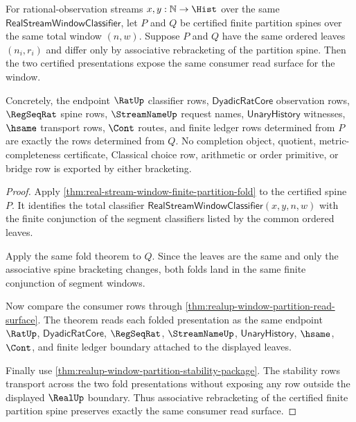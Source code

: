 \begin{theorem}
\label{thm:realup-window-partition-associative-read-surface}
For rational-observation streams $x,y:\mathbb{N}\to\Hist$ over the same
$\mathsf{RealStreamWindowClassifier}$, let $P$ and $Q$ be certified finite
partition spines over the same total window $(n,w)$. Suppose $P$ and $Q$ have
the same ordered leaves $(n_i,r_i)$ and differ only by associative
rebracketing of the partition spine. Then the two certified presentations
expose the same consumer read surface for the window.

Concretely, the endpoint $\RatUp$ classifier rows, $\mathsf{DyadicRatCore}$
observation rows, $\RegSeqRat$ spine rows, $\StreamNameUp$ request names,
$\mathsf{UnaryHistory}$ witnesses, $\hsame$ transport rows, $\Cont$ routes, and
finite ledger rows determined from $P$ are exactly the rows determined from
$Q$. No completion object, quotient, metric-completeness certificate,
Classical choice row, arithmetic or order primitive, or bridge row is exported
by either bracketing.
\end{theorem}
\begin{proof}
Apply \autoref{thm:real-stream-window-finite-partition-fold} to the certified
spine $P$. It identifies the total classifier
$\mathsf{RealStreamWindowClassifier}(x,y,n,w)$ with the finite conjunction of
the segment classifiers listed by the common ordered leaves.

Apply the same fold theorem to $Q$. Since the leaves are the same and only the
associative spine bracketing changes, both folds land in the same finite
conjunction of segment windows.

Now compare the consumer rows through
\autoref{thm:realup-window-partition-read-surface}. The theorem reads each
folded presentation as the same endpoint $\RatUp$, $\mathsf{DyadicRatCore}$,
$\RegSeqRat$, $\StreamNameUp$, $\mathsf{UnaryHistory}$, $\hsame$, $\Cont$, and
finite ledger boundary attached to the displayed leaves.

Finally use \autoref{thm:realup-window-partition-stability-package}. The
stability rows transport across the two fold presentations without exposing
any row outside the displayed $\RealUp$ boundary. Thus associative
rebracketing of the certified finite partition spine preserves exactly the
same consumer read surface.
\end{proof}

